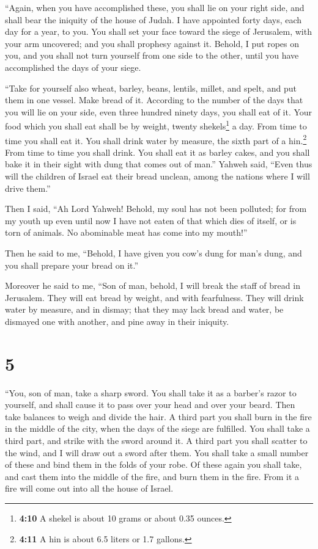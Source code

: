  ``Again, when you have accomplished these, you shall lie
on your right side, and shall bear the iniquity of the house of Judah. I
have appointed forty days, each day for a year, to you. 
You shall set your face toward the siege of Jerusalem, with your arm
uncovered; and you shall prophesy against it.  Behold, I
put ropes on you, and you shall not turn yourself from one side to the
other, until you have accomplished the days of your siege.

 ``Take for yourself also wheat, barley, beans, lentils,
millet, and spelt, and put them in one vessel. Make bread of it.
According to the number of the days that you will lie on your side, even
three hundred ninety days, you shall eat of it.  Your
food which you shall eat shall be by weight, twenty shekels\footnote{\textbf{4:10}
  A shekel is about 10 grams or about 0.35 ounces.} a day. From time to
time you shall eat it.  You shall drink water by measure,
the sixth part of a hin.\footnote{\textbf{4:11} A hin is about 6.5
  liters or 1.7 gallons.} From time to time you shall drink.
 You shall eat it as barley cakes, and you shall bake it
in their sight with dung that comes out of man.''  Yahweh
said, ``Even thus will the children of Israel eat their bread unclean,
among the nations where I will drive them.''

 Then I said, ``Ah Lord Yahweh! Behold, my soul has not
been polluted; for from my youth up even until now I have not eaten of
that which dies of itself, or is torn of animals. No abominable meat has
come into my mouth!''

 Then he said to me, ``Behold, I have given you cow's
dung for man's dung, and you shall prepare your bread on it.''

 Moreover he said to me, ``Son of man, behold, I will
break the staff of bread in Jerusalem. They will eat bread by weight,
and with fearfulness. They will drink water by measure, and in dismay;
 that they may lack bread and water, be dismayed one with
another, and pine away in their iniquity.

\hypertarget{section-4}{%
\section{5}\label{section-4}}

 ``You, son of man, take a sharp sword. You shall take it
as a barber's razor to yourself, and shall cause it to pass over your
head and over your beard. Then take balances to weigh and divide the
hair.  A third part you shall burn in the fire in the
middle of the city, when the days of the siege are fulfilled. You shall
take a third part, and strike with the sword around it. A third part you
shall scatter to the wind, and I will draw out a sword after them.
 You shall take a small number of these and bind them in
the folds of your robe.  Of these again you shall take,
and cast them into the middle of the fire, and burn them in the fire.
From it a fire will come out into all the house of Israel.

